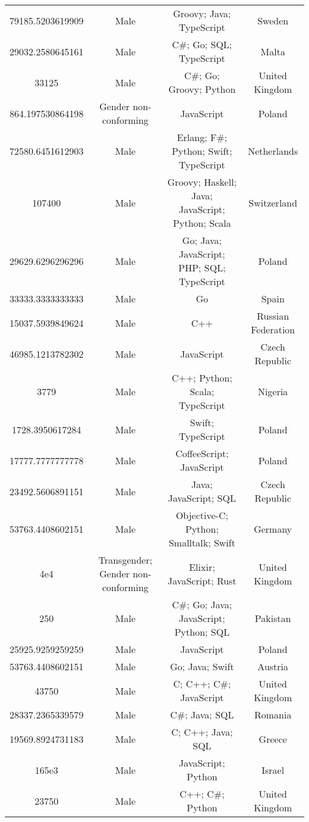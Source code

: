 \begin{center}
\begin{tabular}{ |c|c|c|c| }
79185.5203619909  &  Male  &  Groovy; Java; TypeScript  &  Sweden  \\ 
29032.2580645161  &  Male  &  C\#; Go; SQL; TypeScript  &  Malta  \\ 
33125  &  Male  &  C\#; Go; Groovy; Python  &  United Kingdom  \\ 
864.197530864198  &  Gender non-conforming  &  JavaScript  &  Poland  \\ 
72580.6451612903  &  Male  &  Erlang; F\#; Python; Swift; TypeScript  &  Netherlands  \\ 
107400  &  Male  &  Groovy; Haskell; Java; JavaScript; Python; Scala  &  Switzerland  \\ 
29629.6296296296  &  Male  &  Go; Java; JavaScript; PHP; SQL; TypeScript  &  Poland  \\ 
33333.3333333333  &  Male  &  Go  &  Spain  \\ 
15037.5939849624  &  Male  &  C++  &  Russian Federation  \\ 
46985.1213782302  &  Male  &  JavaScript  &  Czech Republic  \\ 
3779  &  Male  &  C++; Python; Scala; TypeScript  &  Nigeria  \\ 
1728.3950617284  &  Male  &  Swift; TypeScript  &  Poland  \\ 
17777.7777777778  &  Male  &  CoffeeScript; JavaScript  &  Poland  \\ 
23492.5606891151  &  Male  &  Java; JavaScript; SQL  &  Czech Republic  \\ 
53763.4408602151  &  Male  &  Objective-C; Python; Smalltalk; Swift  &  Germany  \\ 
4e4  &  Transgender; Gender non-conforming  &  Elixir; JavaScript; Rust  &  United Kingdom  \\ 
250  &  Male  &  C\#; Go; Java; JavaScript; Python; SQL  &  Pakistan  \\ 
25925.9259259259  &  Male  &  JavaScript  &  Poland  \\ 
53763.4408602151  &  Male  &  Go; Java; Swift  &  Austria  \\ 
43750  &  Male  &  C; C++; C\#; JavaScript  &  United Kingdom  \\ 
28337.2365339579  &  Male  &  C\#; Java; SQL  &  Romania  \\ 
19569.8924731183  &  Male  &  C; C++; Java; SQL  &  Greece  \\ 
165e3  &  Male  &  JavaScript; Python  &  Israel  \\ 
23750  &  Male  &  C++; C\#; Python  &  United Kingdom  \\ 

\end{tabular}
\end{center}
